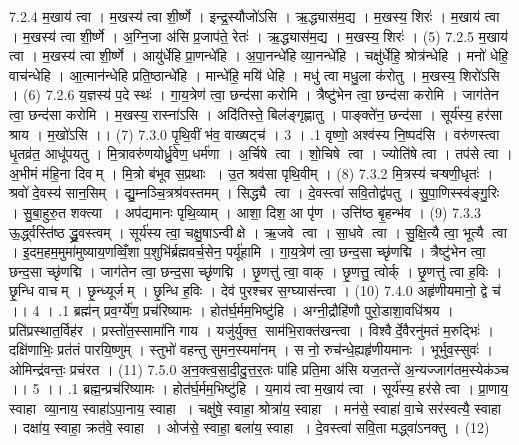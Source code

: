7.2.4
म॒खाय॑ त्वा । म॒खस्य॑ त्वा शी॒र्ष्णे । इन्द्र॒स्यौजो॑ऽसि । ऋ॒द्ध्यास॑म॒द्य । म॒खस्य॒ शिरः॑ । म॒खाय॑ त्वा । म॒खस्य॑ त्वा शी॒र्ष्णे । अ॒ग्नि॒जा अ॑सि प्र॒जाप॑ते॒ रेतः॑ । ऋ॒द्ध्यास॑म॒द्य । म॒खस्य॒ शिरः॑ । (5)
7.2.5
म॒खाय॑ त्वा । म॒खस्य॑ त्वा शी॒र्ष्णे । आयु॑र्धेहि प्रा॒णन्धे॑हि । अ॒पा॒नन्धे॑हि व्या॒नन्धे॑हि । चक्षु॑र्धेहि॒ श्रोत्र॑न्धेहि । मनो॑ धेहि॒ वाच॑न्धेहि । आ॒त्मान॑न्धेहि प्रति॒ष्ठान्धे॑हि । मान्धे॑हि॒ मयि॑ धेहि । मधु॑ त्वा मधु॒ला क॑रोतु । म॒खस्य॒ शिरो॑ऽसि । (6)
7.2.6
य॒ज्ञस्य॑ प॒दे स्थः॑ । गा॒य॒त्रेण॑ त्वा॒ छन्द॑सा करोमि । त्रैष्टु॑भेन त्वा॒ छन्द॑सा करोमि । जाग॑तेन त्वा॒ छन्द॑सा करोमि । म॒खस्य॒ रास्ना॑ऽसि । अदि॑तिस्ते॒ बिल॑ङ्गृह्णातु । पाङ्क्ते॑न॒ छन्द॑सा । सूर्य॑स्य॒ हर॑सा श्राय । म॒खो॑ऽसि ।। (7)
7.3.0
पृ॒थि॒वीं भ॑व॒ वाख्षट्च॑ । 3 ।
.1
वृष्णो॒ अश्व॑स्य नि॒ष्पद॑सि । वरु॑णस्त्वा धृ॒तव्र॑त॒ आधू॑पयतु । मि॒त्रावरु॑णयोर्ध्रु॒वेण॒ धर्म॑णा । अ॒र्चिषे त्वा । शो॒चिषे त्वा । ज्योति॑षे त्वा । तप॑से त्वा । अ॒भीमं म॑हि॒ना दिवम् । मि॒त्रो ब॑भूव स॒प्रथाः । उ॒त श्रव॑सा पृथि॒वीम् । (8)
7.3.2
मि॒त्रस्य॑ चऱ्षणी॒धृतः॑ । श्रवो॑ दे॒वस्य॑ सान॒सिम् । द्यु॒म्नञ्चि॒त्रश्र॑वस्तमम् । सिद्ध्यै त्वा । दे॒वस्त्वा॑ सवि॒तोद्व॑पतु । सु॒पा॒णिस्स्व॑ङ्गु॒रिः । सु॒बा॒हुरु॒त शक्त्या । अप॑द्यमानः पृथि॒व्याम् । आशा॒ दिश॒ आ पृ॑ण । उत्ति॑ष्ठ बृ॒हन्भ॑व । (9)
7.3.3
ऊ॒र्द्ध्वस्ति॑ष्ठ द्ध्रु॒वस्त्वम् । सूर्य॑स्य त्वा॒ चक्षु॒षाऽन्वीक्षे । ऋ॒जवे त्वा । सा॒धवे त्वा । सु॒क्षि॒त्यै त्वा॒ भूत्यै त्वा । इ॒दम॒हम॒मुमा॑मुष्याय॒णव्विँ॒शा प॒शुभि॑र्ब्रह्मवर्च॒सेन॒ पर्यू॑हामि । गा॒य॒त्रेण॑ त्वा॒ छन्द॒सा च्छृ॑णद्मि । त्रैष्टु॑भेन त्वा॒ छन्द॒सा च्छृ॑णद्मि । जाग॑तेन त्वा॒ छन्द॒सा च्छृ॑णद्मि । छृ॒णत्तु॑ त्वा॒ वाक् । छृ॒णत्तु॒ त्वोर्क् । छृ॒णत्तु॑ त्वा ह॒विः । छृ॒न्धि वाचम् । छृ॒न्ध्यूर्जम् । छृ॒न्धि ह॒विः । देव॑ पुरश्चर स॒ग्घ्यास॑न्त्वा । (10)
7.4.0
अहृ॑णीयमानो॒ द्वे च॑ ।। 4 ।
.1
ब्रह्म॑न् प्रव॒र्ग्ये॑ण॒ प्रच॑रिष्यामः । होत॑र्घ॒र्मम॒भिष्टु॑हि । अग्नी॒द्रौहि॑णौ पुरो॒डाशा॒वधि॑श्रय । प्रति॑प्रस्थात॒र्विह॑र । प्रस्तो॑त॒स्सामा॑नि गाय । यजु॑र्युक्त॒ साम॑भि॒राक्त॑खन्त्वा । विश्वैर्दे॒वैरनु॑मतं म॒रुद्भिः॑ । दक्षि॑णाभिः॒ प्रत॑तं पारयि॒ष्णुम् । स्तुभो॑ वहन्तु सुमन॒स्यमा॑नम् । स नो॒ रुच॑न्धे॒ह्यहृ॑णीयमानः । भूर्भुव॒स्सुवः॑ । ओमिन्द्र॑वन्तः॒ प्रच॑रत । (11)
7.5.0
अ॒न॒क्त्व॒सा॒दी॒दु॒त्त॒र॒तः पा॑हि प्रति॒मा अ॑सि यज॒तन्ते॑ अ॒न्यज्जाग॑तम॒स्येक॑ञ्च ।। 5 ।।
.1
ब्रह्म॒न्प्रच॑रिष्यामः । होत॑र्घ॒र्मम॒भिष्टु॑हि । य॒माय॑ त्वा म॒खाय॑ त्वा । सूर्य॑स्य॒ हर॑से त्वा । प्रा॒णाय॒ स्वाहा व्या॒नाय॒ स्वाहा॑ऽपा॒नाय॒ स्वाहा । चक्षु॑षे॒ स्वाहा॒ श्रोत्रा॑य॒ स्वाहा । मन॑से॒ स्वाहा॑ वा॒चे सर॑स्वत्यै॒ स्वाहा । दक्षा॑य॒ स्वाहा॒ क्रत॑वे॒ स्वाहा । ओज॑से॒ स्वाहा॒ बला॑य॒ स्वाहा । दे॒वस्त्वा॑ सवि॒ता मद्ध्वा॑ऽनक्तु । (12)

